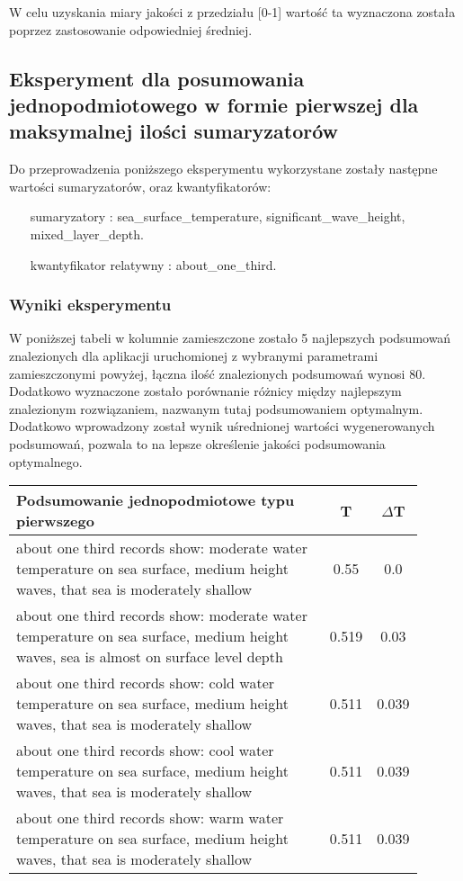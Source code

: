 \documentclass{article}
\begin{document}
\noindent W celu uzyskania miary jakości z przedziału [0-1] wartość ta wyznaczona została poprzez zastosowanie odpowiedniej średniej.


\subsection{Eksperyment dla posumowania jednopodmiotowego w formie pierwszej dla maksymalnej ilości sumaryzatorów}

Do przeprowadzenia poniższego eksperymentu wykorzystane zostały następne wartości sumaryzatorów, oraz kwantyfikatorów:

\begin{itemize}
    \item[sumaryzatory]: sea\_surface\_temperature, significant\_wave\_height, mixed\_layer\_depth.
    \item[kwantyfikator relatywny]: about\_one\_third.
\end{itemize}

\subsubsection{Wyniki eksperymentu}

\noindent W poniższej tabeli w kolumnie zamieszczone zostało 5 najlepszych podsumowań znalezionych dla aplikacji uruchomionej z wybranymi parametrami zamieszczonymi powyżej, łączna ilość znalezionych podsumowań wynosi 80. Dodatkowo wyznaczone zostało porównanie różnicy między najlepszym znalezionym rozwiązaniem, nazwanym tutaj podsumowaniem optymalnym. Dodatkowo wprowadzony został wynik uśrednionej wartości wygenerowanych podsumowań, pozwala to na lepsze określenie jakości podsumowania optymalnego.

\begin{longtable}{|p{0.9\linewidth}|c|c|}
\hline
\textbf{Podsumowanie jednopodmiotowe typu pierwszego} & \textbf{T} & \textbf{\(\Delta \)T} \\
\hline
about one third records show: moderate water temperature on sea surface, medium height waves, that sea is moderately shallow & 0.55 & 0.0 \\ \hline
about one third records show: moderate water temperature on sea surface, medium height waves, sea is almost on surface level depth & 0.519 & 0.03 \\ \hline
about one third records show: cold water temperature on sea surface, medium height waves, that sea is moderately shallow & 0.511 & 0.039 \\ \hline
about one third records show: cool water temperature on sea surface, medium height waves, that sea is moderately shallow & 0.511 & 0.039 \\ \hline
about one third records show: warm water temperature on sea surface, medium height waves, that sea is moderately shallow & 0.511 & 0.039 \\ \hline
\hline
\end{longtable}
\end{document}
